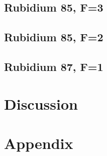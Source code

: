 \documentclass[]{article}
\begin{document}
\newpage
\subsection{Rubidium 85, F=3}
\newpage
\subsection{Rubidium 85, F=2}
\newpage
\subsection{Rubidium 87, F=1}

\newpage
\section{Discussion}


\newpage
\section{Appendix}
\end{document}
